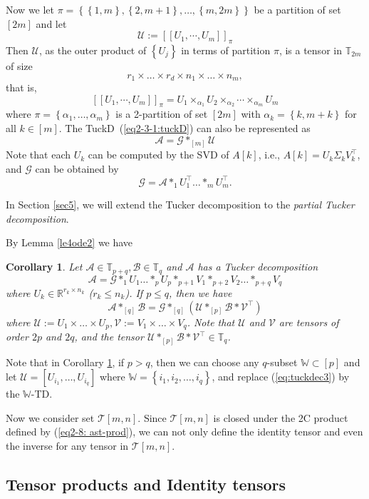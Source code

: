 \documentclass[11pt, oneside]{article}  %
\newtheorem{cor}[thm]{Corollary}
\newcommand{\dsb}[1]{[\![#1]\!]}
\newcommand{\set}[1]{\left\{#1\right\}}
\newcommand{\al}{\alpha}
\newcommand{\RR}{\mathbb{R}}
\newcommand{\TT}{\mathbb{T}}
\newcommand{\bbW}{\mathbb{W}}
\newcommand{\A}{\mathcal{A}}
\newcommand{\B}{\mathcal{B}}
\newcommand{\caG}{\mathcal{G}}
\newcommand{\T}{\mathcal{T}}
\newcommand{\U}{\mathcal{U}}
\newcommand{\V}{\mathcal{V}}
\newcommand{\beq}{\begin{equation}}
\newcommand{\eeq}{\end{equation}}
\begin{document}
Now we let $\pi=\set{\set{1,m}, \set{2,m+1}, \ldots, \set{m, 2m}}$ be a partition of set $[2m]$ and let 
\beq\label{eq2-3-2:U-pi01}
\U:=\dsb{U_{1},\cdots,U_{m}}_{\pi} 
\eeq
Then $\U$, as the outer product of $\set{U_{j}}$ in terms of partition $\pi$, is a tensor in $\TT_{2m}$ of size 
\[ r_{1}\times\ldots\times r_{d}\times n_{1}\times\ldots \times n_{m}, \]  
that is, 
\beq\label{eq:U-pi02}
\dsb{U_{1},\cdots,U_{m}}_{\pi} = U_{1}\times_{\al_{1}}U_{2}\times_{\al_{2}} \cdots \times_{\al_{m}}U_{m} 
\eeq
where $\pi=\set{\al_{1}, \ldots,\al_{m}}$ is a 2-partition of set $[2m]$ with $\al_k = \set{k, m+k}$ for all $k\in [m]$.  The 
TuckD~(\ref{eq2-3-1:tuckD}) can also be represented as 
\beq\label{eq2-3-1:tuckD2}  
\A = \caG\ast_{[m]}\U 
\eeq
Note that each $U_{k}$ can be computed by the SVD of $A[k]$, i.e., $A[k]=U_{k}\Sigma_{k}V_{k}^{\top}$, and $\caG$ can be obtained by 
\[ \caG = \A\ast_{1} U_{1}^{\top}\ldots \ast_m U_{m}^{\top}. \]

In Section \ref{sec5}, we will extend the Tucker decomposition to the \emph{partial Tucker decomposition}.  

By Lemma \ref{le4ode2} we have 
\begin{cor}\label{co2-3-1: TD}
Let $\A\in\TT_{p+q},\B\in\TT_{q}$ and $\A$ has a Tucker decomposition  
\beq\label{eq:tuckdec3}
\A = \caG\ast_{1}U_{1}\ldots \ast_{p}U_{p}\ast_{p+1} V_{1}\ast_{p+2} V_{2}\ldots \ast_{p+q} V_{q}
\eeq
where $U_{k}\in\RR^{r_{k}\times n_{k}}$ ($r_{k}\le n_{k}$). If $p\le q$, then we have 
\beq
\A\ast_{[q]} \B = \caG\ast_{[q]} (\U\ast_{[p]} \B\ast \V^{\top} ) 
\eeq
where $\U:=U_{1}\times \ldots \times U_{p}, \V:=V_{1}\times \ldots \times V_{q}$.  Note that $\U$ and $\V$ are tensors of 
order $2p$ and $2q$, and the tensor $\U\ast_{[p]} \B\ast \V^{\top}\in\TT_{q}$. 
\end{cor}

Note that in Corollary \ref{co2-3-1: TD}, if $p>q$, then we can choose any $q$-subset $\bbW\subset [p]$ and let 
$\U=[U_{i_{1}},\ldots,U_{i_{q}}]$ where $\bbW=\set{i_{1},i_{2},\ldots,i_{q}}$, and replace  (\ref{eq:tuckdec3}) by the $\bbW$-TD.     

Now we consider set $\T[m,n]$.  Since $\T[m,n]$ is closed under the 2C product defined by (\ref{eq2-8: ast-prod}), we can not only 
 define the identity tensor and even the inverse for any tensor in $\T[m,n]$.  
 
 
\subsection{Tensor products and Identity tensors}\label{sec2-4}
\setcounter{equation}{0} 
 
\end{document}
